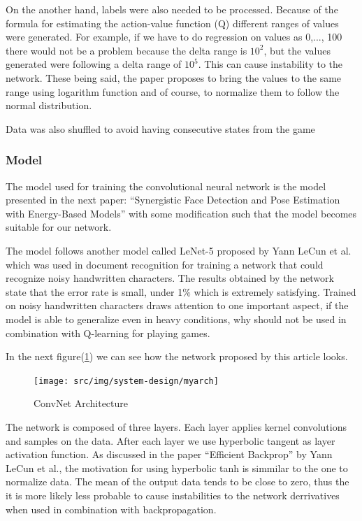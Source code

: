 On the another hand, labels were also needed to be processed. Because of the formula for estimating the action-value function (Q) different ranges of values were generated. For example, if we have to do regression on values as 0,..., 100 there would not be a problem because the delta range is $10^2$, but the values generated were following a delta range of $10^5$. This can cause instability to the network. These being said, the paper proposes to bring the values to the same range using logarithm function and of course, to normalize them to follow the normal distribution.

Data was also shuffled to avoid having consecutive states from the game
\newpage
\subsubsection{Model}

The model used for training the convolutional neural network is the model presented in the next paper: ``Synergistic Face Detection and Pose Estimation with Energy-Based Models''\cite{energy-based} with some modification such that the model becomes suitable for our network.

The model follows another model called LeNet-5 proposed by Yann LeCun et al. which was used in document recognition\cite{basedlearning} for training a network that could recognize noisy handwritten characters. The results obtained by the network state that the error rate is small, under 1$\%$ which is extremely satisfying. Trained on noisy handwritten characters draws attention to one important aspect, if the model is able to generalize even in heavy conditions, why should not be used in combination with Q-learning for playing games.

In the next figure(\ref{fig:myarch}) we can see how the network proposed by this article looks. 

\begin{figure}[h]
	\begin{center}
		\texttt{[image: src/img/system-design/myarch]}
		\caption{ConvNet Architecture} \label{fig:myarch}
    \end{center}
\end{figure}

The network is composed of three layers. Each layer applies kernel convolutions and samples on the data. After each layer we use hyperbolic tangent as layer activation function. As discussed in the paper ``Efficient Backprop'' by Yann LeCun et al., the motivation for using hyperbolic tanh is simmilar to the one to normalize data. The mean of the output data tends to be close to zero, thus the it is more likely less probable to cause instabilities to the network derrivatives when used in combination with backpropagation.

